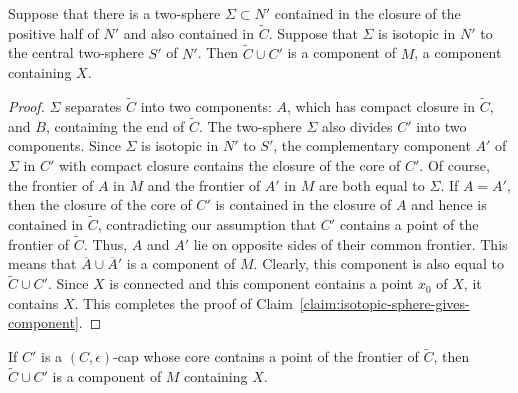 \begin{claim}
\label{claim:isotopic-sphere-gives-component}
\label{sinside}
Suppose that there is a two-sphere $\Sigma\subset N'$ contained in
the closure of the positive half of $N'$ and also contained in
$\widetilde C$. Suppose that $\Sigma$ is isotopic in $N'$ to the
central two-sphere $S'$ of $N'$. Then $\widetilde C\cup C'$ is a
component of $M$, a component containing $X$.
\end{claim}

\begin{proof}
\sketch
$\Sigma$ separates $\widetilde C$ into two components: $A$, which
has compact closure in $\widetilde C$, and $B$, containing the end
of $\widetilde C$. The two-sphere $\Sigma$ also divides $C'$ into
two components. Since $\Sigma$ is isotopic in $N'$ to $S'$, the
complementary component $A'$ of $\Sigma$ in $C'$ with compact
closure contains the closure of the core of $C'$. Of course, the
frontier of $A$ in $M$ and the frontier of $A'$ in $M$ are both
equal to $\Sigma$. If $A=A'$, then the closure of the core of $C'$
is contained in the closure of $A$ and hence is contained in
$\widetilde C$, contradicting our assumption that $C'$ contains a
point of the frontier of $\widetilde C$. Thus, $A$ and $A'$ lie on
opposite sides of their common frontier. This means that $\overline
A\cup \overline A'$ is a component of $M$. Clearly, this component
is also equal to $\widetilde C\cup C'$. Since $X$ is connected and
this component contains a point $x_0$ of $X$, it contains $X$. This
completes the proof of Claim~\ref{claim:isotopic-sphere-gives-component}.
\end{proof}

\begin{claim}
\label{claim:cap-union-is-component}
\label{cccomponent}
If $C'$ is a $(C,\epsilon)$-cap whose core contains a point of the
frontier of $\widetilde C$, then $\widetilde C\cup C'$ is a
component of $M$ containing $X$.
\end{claim}

